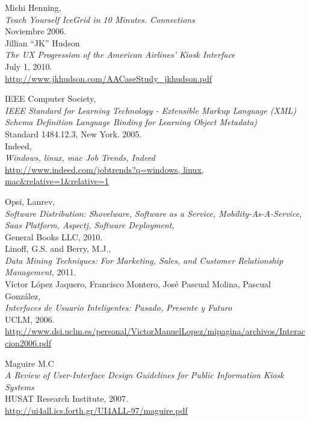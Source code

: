 \begin{thebibliography}{XXX}
	 Michi Henning,\\
    \newblock \emph{Teach Yourself IceGrid in 10 Minutes. Connections}\\
    Noviembre 2006.\\
    
     Jillian “JK” Hudson\\
    \newblock \emph{The UX Progression of the American Airlines’ Kiosk Interface}\\
    July 1, 2010.\\
    \url{http://www.jkhudson.com/AACaseStudy\_jkhudson.pdf}
    
     IEEE Computer Society,\\
    \newblock \emph{IEEE Standard for Learning Technology - Extensible Markup Language (XML) 
    Schema Definition Language Binding for Learning Object Metadata)}\\
    Standard 1484.12.3, New York. 2005.\\
    
	 Indeed,\\ 
    \newblock \emph{Windows, linux, mac Job Trends, Indeed}\\
    \url{http://www.indeed.com/jobtrends?q=windows, linux, mac&relative=1&relative=1}
    
     Opsi, Lanrev,\\
	\newblock \emph{Software Distribution: Shovelware, Software as a Service, Mobility-As-A-Service, Saas Platform, Aspectj, Software Deployment, }\\
	General Books LLC, 2010.\\
	
	 Linoff, G.S. and Berry, M.J.,\\
    \newblock \emph{Data Mining Techniques: For Marketing, Sales, and Customer
    Relationship Management}, 2011.\\
    
     Víctor López Jaquero, Francisco Montero, José
    Pascual Molina, Pascual González,\\
    \newblock \emph{Interfaces de Usuario Inteligentes: Pasado, Presente y Futuro}\\
    UCLM, 2006.\\
    \url{http://www.dsi.uclm.es/personal/VictorManuelLopez/mipagina/archivos/Interaccion2006.pdf}
    
     Maguire M.C\\
    \newblock \emph{A Review of User-Interface Design Guidelines for 
    Public Information Kiosk Systems}\\
    HUSAT Research Institute, 2007.\\
    \url{http://ui4all.ics.forth.gr/UI4ALL-97/maguire.pdf}
    

\end{thebibliography}
